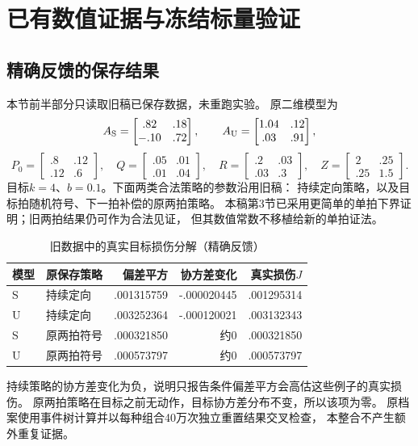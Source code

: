 \section{已有数值证据与冻结标量验证}
\subsection{精确反馈的保存结果}
本节前半部分只读取旧稿已保存数据，未重跑实验。
原二维模型为
\[
A_{\rm S}=\begin{bmatrix}.82&.18\\-.10&.72\end{bmatrix},\qquad
A_{\rm U}=\begin{bmatrix}1.04&.12\\.03&.91\end{bmatrix},
\]
\[
P_0=\begin{bmatrix}.8&.12\\.12&.6\end{bmatrix},\quad
Q=\begin{bmatrix}.05&.01\\.01&.04\end{bmatrix},\quad
R=\begin{bmatrix}.2&.03\\.03&.3\end{bmatrix},\quad
Z=\begin{bmatrix}2&.25\\.25&1.5\end{bmatrix}.
\]
目标$k=4$、$b=0.1$。下面两类合法策略的参数沿用旧稿：
持续定向策略，以及目标拍随机符号、下一拍补偿的原两拍策略。
本稿第3节已采用更简单的单拍下界证明；旧两拍结果仍可作为合法见证，
但其数值常数不移植给新的单拍证法。

\begin{table}[ht]
\centering\small
\caption{旧数据中的真实目标损伤分解（精确反馈）}
\begin{tabular}{llrrr}
\toprule
模型 & 原保存策略 & 偏差平方 & 协方差变化 & 真实损伤$J$\\
\midrule
S & 持续定向 & .001315759 & -.000020445 & .001295314\\
U & 持续定向 & .003252364 & -.000120021 & .003132343\\
S & 原两拍符号 & .000321850 & 约0 & .000321850\\
U & 原两拍符号 & .000573797 & 约0 & .000573797\\
\bottomrule
\end{tabular}
\end{table}
持续策略的协方差变化为负，说明只报告条件偏差平方会高估这些例子的真实损伤。
原两拍策略在目标之前无动作，目标协方差分布不变，所以该项为零。
原档案使用事件树计算并以每种组合40万次独立重置结果交叉检查，
本整合不产生额外重复证据。

